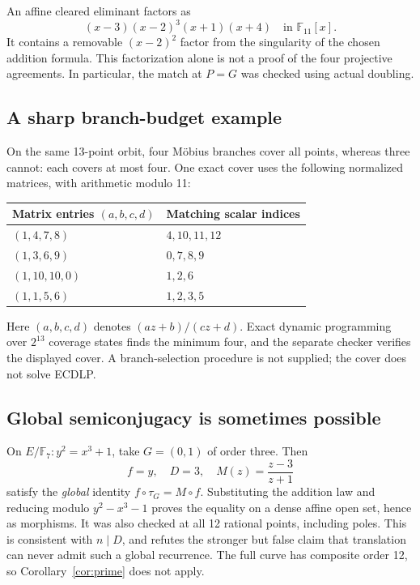 \documentclass[11pt,letterpaper]{article}
\theoremstyle{definition}
\theoremstyle{remark}
\newcommand{\F}{\mathbb F}
\newcommand{\tauG}{\tau_G}
\begin{document}
An affine cleared eliminant factors as
\[
(x-3)(x-2)^3(x+1)(x+4)\quad\text{in }\F_{11}[x].
\]
It contains a removable $(x-2)^2$ factor from the singularity of the chosen addition formula. This factorization alone is not a proof of the four projective agreements. In particular, the match at $P=G$ was checked using actual doubling.

\subsection{A sharp branch-budget example}

On the same 13-point orbit, four M\"obius branches cover all points, whereas three cannot: each covers at most four. One exact cover uses the following normalized matrices, with arithmetic modulo 11:
\begin{center}
\begin{tabular}{ll}
\toprule
Matrix entries $(a,b,c,d)$ & Matching scalar indices\\
\midrule
$(1,4,7,8)$ & $4,10,11,12$\\
$(1,3,6,9)$ & $0,7,8,9$\\
$(1,10,10,0)$ & $1,2,6$\\
$(1,1,5,6)$ & $1,2,3,5$\\
\bottomrule
\end{tabular}
\end{center}
Here $(a,b,c,d)$ denotes $(az+b)/(cz+d)$. Exact dynamic programming over $2^{13}$ coverage states finds the minimum four, and the separate checker verifies the displayed cover. A branch-selection procedure is not supplied; the cover does not solve ECDLP.

\subsection{Global semiconjugacy is sometimes possible}

On $E/\F_7:y^2=x^3+1$, take $G=(0,1)$ of order three. Then
\[
f=y,\quad D=3,\quad M(z)=\frac{z-3}{z+1}
\]
satisfy the \emph{global} identity $f\circ\tauG=M\circ f$. Substituting the addition law and reducing modulo $y^2-x^3-1$ proves the equality on a dense affine open set, hence as morphisms. It was also checked at all 12 rational points, including poles. This is consistent with $n\mid D$, and refutes the stronger but false claim that translation can never admit such a global recurrence. The full curve has composite order 12, so Corollary~\ref{cor:prime} does not apply.
\end{document}
